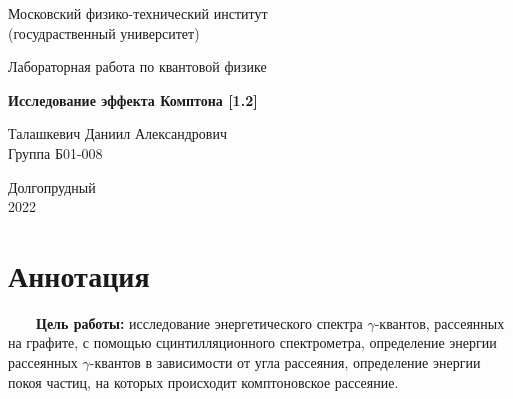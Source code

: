 \documentclass[a4paper, 12pt]{article}%
\begin{document}


\begin{titlepage}

	\newpage
	\begin{center}
		\normalsize Московский физико-технический институт \\(госудраственный 			университет)
	\end{center}

	\vspace{6em}

	\begin{center}
		\Large Лабораторная работа по квантовой физике\\
	\end{center}

	\vspace{1em}

	\begin{center}
		\large \textbf{Исследование эффекта Комптона [1.2]}
	\end{center}

	\vspace{2em}

	\begin{center}
		\large Талашкевич Даниил Александрович\\
		Группа Б01-008
	\end{center}

	\vspace{\fill}

	\begin{center}
	Долгопрудный \\2022
	\end{center}
	
\end{titlepage}



	\thispagestyle{empty}
	\newpage
	\tableofcontents
	\newpage
	\setcounter{page}{1}



\section{Аннотация}

\ \ \ \ \textbf{Цель работы:} исследование энергетического спектра $\gamma$-квантов, рассеянных на графите, с помощью сцинтилляционного спектрометра, определение энергии рассеянных $\gamma$-квантов в зависимости от угла рассеяния, определение энергии покоя частиц, на которых происходит комптоновское рассеяние.
\end{document}
